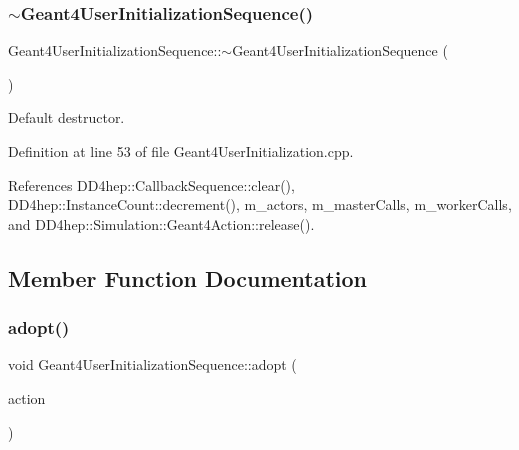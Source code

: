 \subsubsection{\texorpdfstring{$\sim$\+Geant4\+User\+Initialization\+Sequence()}{~Geant4UserInitializationSequence()}}
{\footnotesize\ttfamily Geant4\+User\+Initialization\+Sequence\+::$\sim$\+Geant4\+User\+Initialization\+Sequence (\begin{DoxyParamCaption}{ }\end{DoxyParamCaption})\hspace{0.3cm}{\ttfamily [virtual]}}



Default destructor. 



Definition at line 53 of file Geant4\+User\+Initialization.\+cpp.



References D\+D4hep\+::\+Callback\+Sequence\+::clear(), D\+D4hep\+::\+Instance\+Count\+::decrement(), m\+\_\+actors, m\+\_\+master\+Calls, m\+\_\+worker\+Calls, and D\+D4hep\+::\+Simulation\+::\+Geant4\+Action\+::release().



\subsection{Member Function Documentation}
\hypertarget{class_d_d4hep_1_1_simulation_1_1_geant4_user_initialization_sequence_a00f01d23b874b3c99c6877ce01b6b702}{}\label{class_d_d4hep_1_1_simulation_1_1_geant4_user_initialization_sequence_a00f01d23b874b3c99c6877ce01b6b702} 
\subsubsection{\texorpdfstring{adopt()}{adopt()}}
{\footnotesize\ttfamily void Geant4\+User\+Initialization\+Sequence\+::adopt (\begin{DoxyParamCaption}\item[{\hyperlink{class_d_d4hep_1_1_simulation_1_1_geant4_user_initialization}{Geant4\+User\+Initialization} $\ast$}]{action }\end{DoxyParamCaption})}



